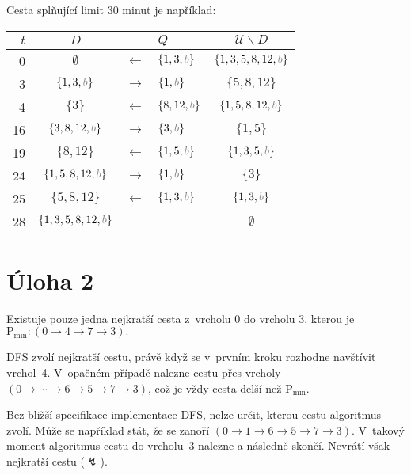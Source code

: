 \documentclass{article}
\newcommand{\U}{\mathcal{U}}
\newcommand{\myb}{{\color{gray} b}}
\newcommand{\Pmin}{\text{P}_\text{min}}
\begin{document}
    Cesta splňující limit 30 minut je například:
    \begin{center}
    { \renewcommand{\arraystretch}{1.2}
        \begin{tabular}
        { r !{\color{lightgray}\vrule} c !{\color{lightgray}\vrule} r l !{\color{lightgray}\vrule} c }
            $t$ & $D$                        &               & $Q$               & $\U \smallsetminus D$      \\
               & $\emptyset$                & $\leftarrow$  & $\{1,3, \myb\}$   & $\{1, 3, 5, 8, 12, \myb\}$ \\[2mm]
            3   & $\{1, 3, \myb\}$           & $\rightarrow$ & $\{1, \myb\}$     & $\{5, 8, 12\}$             \\[2mm]
            4   & $\{3\}$                    & $\leftarrow$  & $\{8, 12, \myb\}$ & $\{1, 5, 8, 12, \myb\}$    \\[2mm]
            16  & $\{3, 8, 12, \myb\}$       & $\rightarrow$ & $\{3, \myb\}$     & $\{1, 5\}$                 \\[2mm]
            19  & $\{8, 12\}$                & $\leftarrow$  & $\{1, 5, \myb\}$  & $\{1, 3, 5, \myb\}$        \\[2mm]
            24  & $\{1, 5, 8, 12, \myb\}$    & $\rightarrow$ & $\{1, \myb\}$     & $\{3\}$                    \\[2mm]
            25  & $\{5, 8, 12\}$             & $\leftarrow$  & $\{1,3, \myb\}$   & $\{1, 3, \myb\}$           \\[2mm]
            28  & $\{1, 3, 5, 8, 12, \myb\}$ &               &                   & $\emptyset$                \\[2mm]
        \end{tabular}}
    \end{center}

    \section*{Úloha 2}

    Existuje pouze jedna nejkratší cesta z~vrcholu 0 do vrcholu 3, kterou je
    \(
    \Pmin: (0 \rightarrow 4 \rightarrow 7 \rightarrow 3).
    \)

    DFS zvolí nejkratší cestu, právě když se v~prvním kroku rozhodne navštívit vrchol~4.
    V~opačném případě nalezne cestu přes vrcholy $(0 \rightarrow \cdots \rightarrow 6 \rightarrow 5 \rightarrow 7 \rightarrow 3)$,
    což je vždy cesta delší než $\Pmin$.

    Bez bližší specifikace implementace DFS, nelze určit, kterou cestu algoritmus zvolí. Může se například stát, že se zanoří $(0 \rightarrow 1 \rightarrow 6 \rightarrow 5 \rightarrow 7 \rightarrow 3)$. V~takový moment algoritmus cestu do vrcholu~3 nalezne a následně skončí. Nevrátí však nejkratší cestu ($\lightning$).
\end{document}
